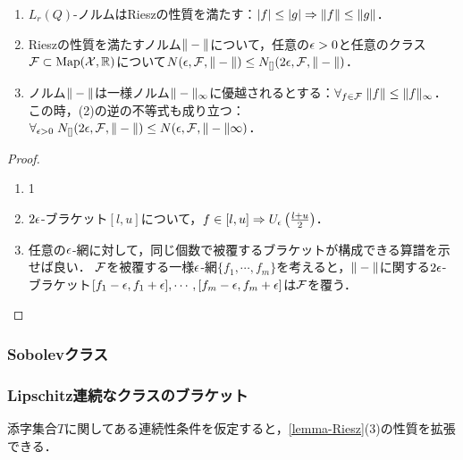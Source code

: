 \documentclass[uplatex,dvipdfmx]{jsreport}
\begin{document}
\begin{lemma}[Rieszの性質]\mbox{}\label{lemma-Riesz}
    \begin{enumerate}
        \item $L_r(Q)$-ノルムはRieszの性質を満たす：$\lvert f\rvert\le\lvert g\rvert\Rightarrow\|f\|\le\|g\|$．
        \item Rieszの性質を満たすノルム$\|-\|$について，任意の$\epsilon>0$と任意のクラス$\mathcal{F}\subset\mathrm{Map}(\mathcal{X},\mathbb{R})$について$N(\epsilon,\mathcal{F},\|-\|)\le N_{[]}(2\epsilon,\mathcal{F},\|-\|)$．
        \item ノルム$\|-\|$は一様ノルム$\|-\|_\infty$に優越されるとする：$\forall_{f\in\mathcal{F}}\;\|f\|\le\|f\|_\infty$．この時，(2)の逆の不等式も成り立つ：$\forall_{\epsilon>0}\;N_{[]}(2\epsilon,\mathcal{F},\|-\|)\le N(\epsilon,\mathcal{F},\|-\|\infty)$．
    \end{enumerate}
\end{lemma}
\begin{proof}\mbox{}
    \begin{enumerate}
        \item 1
        \item $2\epsilon$-ブラケット$[l,u]$について，$f\in[l,u]\Rightarrow U_{\epsilon}\left(\frac{l+u}{2}\right)$．
        \item 任意の$\epsilon$-網に対して，同じ個数で被覆するブラケットが構成できる算譜を示せば良い．
        $\mathcal{F}$を被覆する一様$\epsilon$-網$\{f_1,\cdots,f_m\}$を考えると，$\|-\|$に関する$2\epsilon$-ブラケット$[f_1-\epsilon,f_1+\epsilon],\cdots,[f_m-\epsilon,f_m+\epsilon]$は$\mathcal{F}$を覆う．
    \end{enumerate}
\end{proof}

\subsubsection{Sobolevクラス}

\begin{lemma}\label{lemma-bracket-number-for-uniform-norm}
    
\end{lemma}

\subsubsection{Lipschitz連続なクラスのブラケット}

\begin{tcolorbox}[colframe=ForestGreen, colback=ForestGreen!10!white,breakable,colbacktitle=ForestGreen!40!white,coltitle=black,fonttitle=\bfseries\sffamily,
title=]
    添字集合$T$に関してある連続性条件を仮定すると，\ref{lemma-Riesz}(3)の性質を拡張できる．
\end{tcolorbox}
\end{document}
